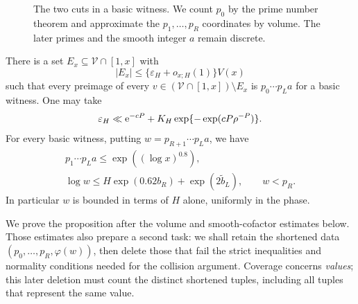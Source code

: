 \begin{figure}[ht]
\centering
{}
\caption{The two cuts in a basic witness. We count $p_0$ by the prime
number theorem and approximate the $p_1,\ldots,p_R$ coordinates by volume.
The later primes and the smooth integer $a$ remain discrete.}
\label{fig:two-cuts}
\end{figure}

\begin{proposition}\label{prop:basic}
There is a set \(E_x\subseteq\mathcal V\cap[1,x]\) with
\[
 |E_x|\le\{\varepsilon_H+o_{x;H}(1)\}V(x)
\]
such that every preimage of every
\(v\in(\mathcal V\cap[1,x])\setminus E_x\) is
\(p_0\cdots p_La\) for a basic witness.  One may take
\[
 \varepsilon_H\ll
 \mathrm e^{-cP}+K_H\exp\{-\exp(cP\rho^{-P})\}.
\]
For every basic witness, putting \(w=p_{R+1}\cdots p_La\), we have
\begin{equation}\label{eq:cofactor-size}
 \begin{gathered}
 p_1\cdots p_La\le\exp((\log x)^{0.8}),\\
 \log w\le H\exp(0.62b_R)+\exp(2\widetilde b_L),
 \qquad w<p_R.
 \end{gathered}
\end{equation}
In particular \(w\) is bounded in terms of \(H\) alone, uniformly
in the phase.
\end{proposition}

We prove the proposition after the volume and smooth-cofactor estimates
below. Those estimates also prepare a second task: we shall retain the
shortened data \((p_0,\ldots,p_R,\varphi(w))\), then delete those
that fail the strict inequalities and normality conditions needed for
the collision argument. Coverage concerns \emph{values}; this later
deletion must count the distinct shortened tuples, including all tuples
that represent the same value.

